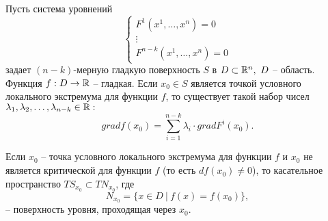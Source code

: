 \begin{theorem}
    Пусть система уровнений
    \begin{equation}\label{eq:20}
        \left\{\begin{array}{l}
            F^1(x^1,\ldots,x^n) = 0 \\
            \vdots                  \\
            F^{n-k}(x^1,\ldots,x^n) = 0
        \end{array}\right.
    \end{equation}
    задает $(n-k)$-мерную гладкую поверхность $S$ в $D \subset \mathbb{R}^n, \ D$ -- область. Функция $f:D\rightarrow\mathbb{R}$ -- гладкая. Если $x_0 \in S$ является точкой условного локального экстремума для функции $f$, то существует такой набор чисел $\lambda_1,\lambda_2,\ldots,\lambda_{n-k} \in \mathbb{R}:$
    \[
        grad f(x_0) = \sum_{i = 1}^{n-k}\lambda_i \cdot grad F^i(x_0).
    \]
\end{theorem}

\begin{lemma}\label{lemma:1}
    Если $x_0$ -- точка условного локального экстремума для функции $f$ и $x_0$ не является критической для функции $f$ (то есть $df(x_0)\ne0$), то касательное пространство $TS_{x_0}\subset TN_{x_0}$, где
    \[
        N_{x_0} = \big\{x \in D \ \big| \ f(x) = f(x_0)\big\},
    \] -- поверхность уровня, проходящая через $x_0$.
\end{lemma}


